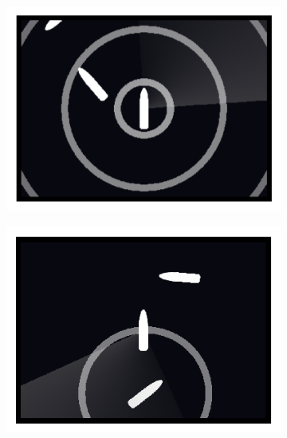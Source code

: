 \documentclass[a4paper, 9pt]{article}
\begin{document}
\begin{flushleft}
\begin{figure}[h]
\centering
\begin{subfigure}[b]{0.3\textwidth}
\centering
\includegraphics[width=\textwidth]{100ms Latency (0)}
\end{subfigure}
\centering
\begin{subfigure}[b]{0.3\textwidth}
\centering
\includegraphics[width=\textwidth]{100ms Latency (2)}
\end{subfigure}
\centering
\begin{subfigure}[b]{0.3\textwidth}
\centering

\end{subfigure}
\end{figure}
\end{flushleft}
\end{document}
